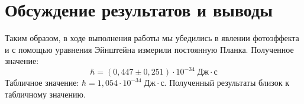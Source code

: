 \documentclass[a4paper, 12pt]{article}
\begin{document}
\section{Обсуждение результатов и выводы}

Таким образом, в ходе выполнения работы мы убедились в явлении фотоэффекта и с помощью уравнения Эйнштейна измерили постоянную Планка. Полученное значение:
\begin{equation}
\boxed{\hbar = (0,447 \pm 0,251) \cdot 10^{-34} \; Дж \cdot с}
\end{equation}
Табличное значение: $ \hbar = 1,054 \cdot 10^{-34} \; Дж \cdot с $. Полученный результаты близок к табличному значению. 
\end{document}
